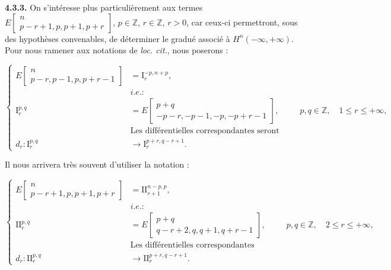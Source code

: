 \clearpage
{}%
\begingroup\small\setlength{\parskip}{0pt}\setlength{\emergencystretch}{1.5em}
\medskip\noindent\textbf{4.3.3.}\quad
On s'intéresse plus particulièrement aux termes
$E\!\left[\begin{smallmatrix}n\\p-r+1,p,p+1,p+r\end{smallmatrix}\right]$,
$p\in\mathbb Z$, $r\in\mathbb Z$, $r>0$, car ceux-ci permettront, sous des
hypothèses convenables, de déterminer le gradué associé à
$H^n(-\infty,+\infty)$. Pour nous ramener aux notations de \emph{loc. cit.},
nous poserons :

\[
\left\{
\begin{aligned}
E\!\left[\begin{smallmatrix}n\\p-r,p-1,p,p+r-1\end{smallmatrix}\right]
  &=\mathrm I_r^{-p,n+p},\\
&\textit{i.e.}:\\[-2pt]
\mathrm I_r^{p,q}
  &=E\!\left[\begin{smallmatrix}p+q\\-p-r,-p-1,-p,-p+r-1\end{smallmatrix}\right],
  &&p,q\in\mathbb Z,\quad 1\leq r\leq+\infty,\\
&\text{Les différentielles correspondantes seront notées :}\\[-2pt]
d_r\colon\mathrm I_r^{p,q}&\longrightarrow
  \mathrm I_r^{p+r,q-r+1}.
\end{aligned}
\right.
\tag{4.3.3.1}
\]

Il nous arrivera très souvent d'utiliser la notation :

\[
\left\{
\begin{aligned}
E\!\left[\begin{smallmatrix}n\\p-r+1,p,p+1,p+r\end{smallmatrix}\right]
  &=\mathrm{II}_{r+1}^{n-p,p},\\
&\textit{i.e.}:\\[-2pt]
\mathrm{II}_r^{p,q}
  &=E\!\left[\begin{smallmatrix}p+q\\q-r+2,q,q+1,q+r-1\end{smallmatrix}\right],
  &&p,q\in\mathbb Z,\quad 2\leq r\leq+\infty,\\
&\text{Les différentielles correspondantes seront notées :}\\[-2pt]
d_r\colon\mathrm{II}_r^{p,q}&\longrightarrow
  \mathrm{II}_r^{p+r,q-r+1}.
\end{aligned}
\right.
\tag{4.3.3.2}
\]

